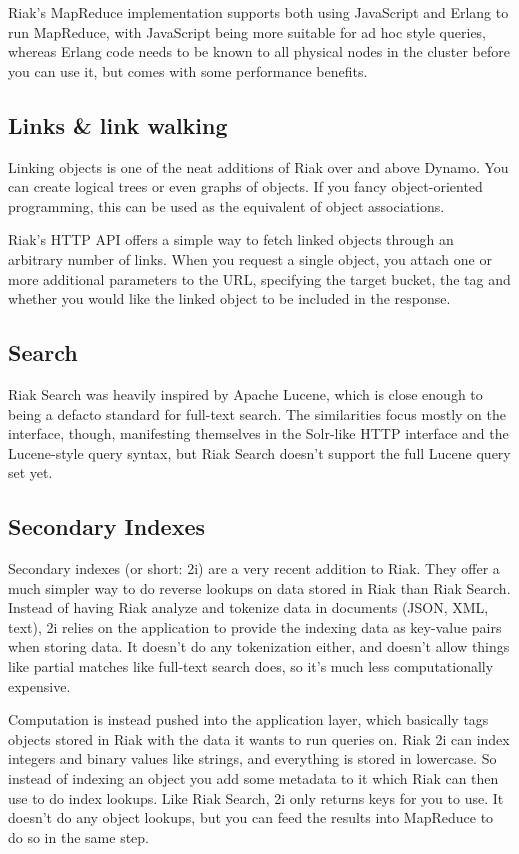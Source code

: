 Riak's MapReduce implementation supports both using JavaScript and Erlang to run MapReduce, with JavaScript being more suitable for ad hoc style queries, whereas Erlang code needs to be known to all physical nodes in the cluster before you can use it, but comes with some performance benefits.

\subsection{Links & link walking}

Linking objects is one of the neat additions of Riak over and above Dynamo. You can create logical trees or even graphs of objects. If you fancy object-oriented programming, this can be used as the equivalent of object associations.

Riak's HTTP API offers a simple way to fetch linked objects through an arbitrary number of links. When you request a single object, you attach one or more additional parameters to the URL, specifying the target bucket, the tag and whether you would like the linked object to be included in the response.

\subsection{Search}

Riak Search was heavily inspired by Apache Lucene, which is close enough to being a defacto standard for full-text search. The similarities focus mostly on the interface, though, manifesting themselves in the Solr-like HTTP interface and the Lucene-style query syntax, but Riak Search doesn't support the full Lucene query set yet.

\subsection{Secondary Indexes}

Secondary indexes (or short: 2i) are a very recent addition to Riak. They offer a much simpler way to do reverse lookups on data stored in Riak than Riak Search. Instead of having Riak analyze and tokenize data in documents (JSON, XML, text), 2i relies on the application to provide the indexing data as key-value pairs when storing data. It doesn't do any tokenization either, and doesn't allow things like partial matches like full-text search does, so it's much less computationally expensive.

Computation is instead pushed into the application layer, which basically tags objects stored in Riak with the data it wants to run queries on. Riak 2i can index integers and binary values like strings, and everything is stored in lowercase. So instead of indexing an object you add some metadata to it which Riak can then use to do index lookups. Like Riak Search, 2i only returns keys for you to use. It doesn't do any object lookups, but you can feed the results into MapReduce to do so in the same step.

